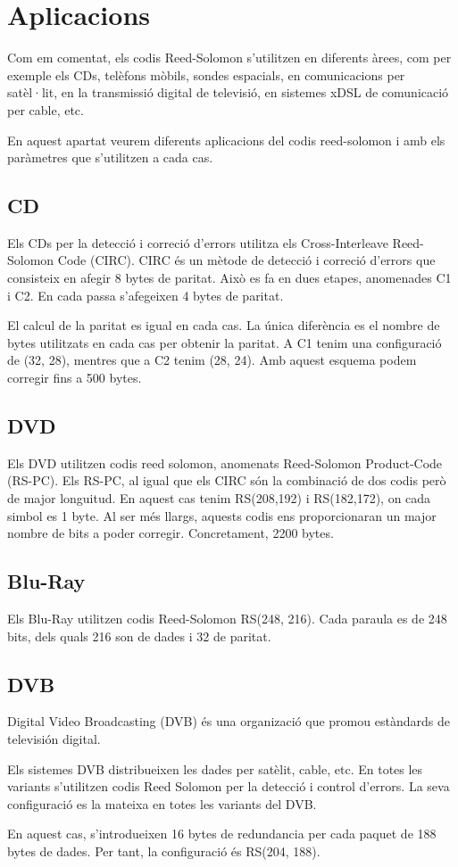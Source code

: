 \section{Aplicacions}
Com em comentat, els codis Reed-Solomon s'utilitzen en diferents àrees, com per
exemple els CDs, telèfons mòbils, sondes espacials, en comunicacions per
satèl·lit, en la transmissió digital de televisió, en sistemes xDSL de
comunicació per cable, etc.

En aquest apartat veurem diferents aplicacions del codis reed-solomon
i amb els paràmetres que s'utilitzen a cada cas. 

\subsection{CD}
Els CDs per la detecció i correció d'errors utilitza els Cross-Interleave
Reed-Solomon Code (CIRC). CIRC és un mètode de detecció i correció d'errors que
consisteix en afegir 8 bytes de paritat. Això es fa en dues etapes, anomenades
C1 i C2. En cada passa s'afegeixen 4 bytes de paritat. 

El calcul de la paritat es igual en cada cas. La única diferència es el nombre
de bytes utilitzats en cada cas per obtenir la paritat. A C1 tenim una
configuració de (32, 28), mentres que a C2 tenim (28, 24). Amb aquest esquema
podem corregir fins a 500 bytes. 

\subsection{DVD}
Els DVD utilitzen codis reed solomon, anomenats Reed-Solomon Product-Code
(RS-PC). Els RS-PC, al igual que els CIRC són la combinació de dos codis però
de major longuitud. En aquest cas tenim RS(208,192) i RS(182,172), on cada
simbol es 1 byte. Al ser més llargs, aquests codis ens proporcionaran un major
nombre de bits a poder corregir. Concretament, 2200 bytes. 
     
\subsection{Blu-Ray}
Els Blu-Ray utilitzen codis Reed-Solomon RS(248, 216). Cada paraula es de 248
bits, dels quals 216 son de dades i 32 de paritat.

\subsection{DVB}
Digital Video Broadcasting (DVB) és una organizació que promou estàndards
de televisión digital. 

Els sistemes DVB distribueixen les dades per satèlit, cable, etc. En totes les
variants s'utilitzen codis Reed Solomon per la detecció i control d'errors. La
seva configuració es la mateixa en totes les variants del DVB. 

En aquest cas, s'introdueixen 16 bytes de redundancia per cada paquet de 188
bytes de dades. Per tant, la configuració és RS(204, 188). 

 